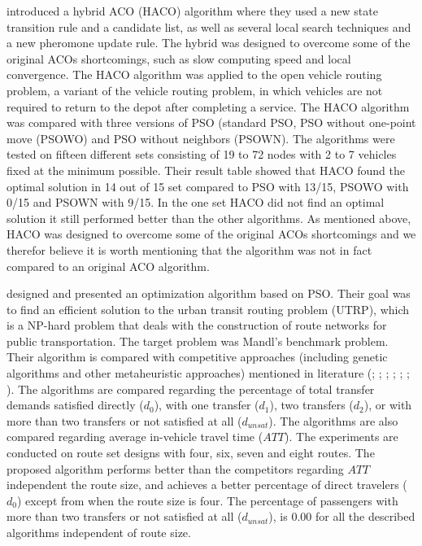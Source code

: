 \citet{sedighpour14} introduced a hybrid ACO (HACO) algorithm where they used a new state transition rule and a candidate list, as well as several local search techniques and a new pheromone update rule. The hybrid was designed to overcome some of the original ACOs shortcomings, such as slow computing speed and local convergence. The HACO algorithm was applied to the open vehicle routing problem, a variant of the vehicle routing problem, in which vehicles are not required to return to the depot after completing a service. The HACO algorithm was compared with three versions of PSO (standard PSO, PSO without one-point move (PSOWO) and PSO without neighbors (PSOWN). The algorithms were tested on fifteen different sets consisting of 19 to 72 nodes with 2 to 7 vehicles fixed at the minimum possible. Their result table showed that HACO found the optimal solution in 14 out of 15 set compared to PSO with 13/15, PSOWO with 0/15 and PSOWN with 9/15. In the one set HACO did not find an optimal solution it still performed better than the other algorithms. As mentioned above, HACO was designed to overcome some of the original ACOs shortcomings and we therefor believe it is worth mentioning that the algorithm was not in fact compared to an original ACO algorithm. 

\citet{kechagiopoulos14} designed and presented an optimization algorithm based on PSO. Their goal was to find an efficient solution to the urban transit routing problem (UTRP), which is a NP-hard problem that deals with the construction of route networks for public transportation. The target problem was Mandl's benchmark problem. Their algorithm is compared with competitive approaches (including genetic algorithms and other metaheuristic approaches) mentioned in literature (\citet{baaj91}; \citet{chakroborty02}; \citet{kidwai98}; \citet{fan10}; \citet{fan09-2}; \citet{zhang10}; \citet{chew12}). The algorithms are compared regarding the percentage of total transfer demands satisfied directly ($d_0$), with one transfer ($d_1$), two transfers ($d_2$), or with more than two transfers or not satisfied at all ($d_{unsat}$). The algorithms are also compared regarding average in-vehicle travel time ($ATT$). The experiments are conducted on route set designs with four, six, seven and eight routes. The proposed algorithm performs better than the competitors regarding $ATT$ independent the route size, and achieves a better percentage of direct travelers ($d_0$) except from when the route size is four. The percentage of passengers with more than two transfers or not satisfied at all ($d_{unsat}$), is $0.00$ for all the described algorithms independent of route size. \newline

